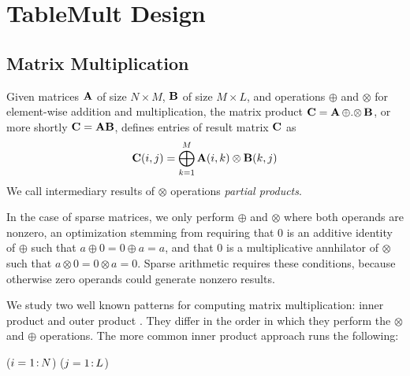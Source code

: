 
\section{TableMult Design}
\label{sDesign}


\subsection{Matrix Multiplication}
\label{sMatMul}
Given matrices $\mathbf{A}$ of size $N \times M$, $\mathbf{B}$ of size $M \times L$,
and operations $\oplus$ and $\otimes$ for element-wise addition and multiplication,
the matrix product $\mathbf{C} = \mathbf{A} \,{\oplus}.{\otimes}\, \mathbf{B} $, or more shortly $\mathbf{C} = \mathbf{A}\mathbf{B}$,
defines entries of result matrix $\mathbf{C}$ as 
\[ \mathbf{C}(i,j) = \bigoplus_{k=1}^M \mathbf{A}(i,k) \otimes \mathbf{B}(k,j) \]
We call intermediary results of $\otimes$ operations \emph{partial products}.

In the case of sparse matrices, we only perform $\oplus$ and $\otimes$ where both operands are nonzero,
an optimization stemming from requiring that 0 is an additive identity of $\oplus$ such that $a \oplus 0 = 0 \oplus a = a$,
and that 0 is a multiplicative annhilator of $\otimes$ such that $a \otimes 0 = 0 \otimes a = 0$.
Sparse arithmetic requires these conditions, because otherwise zero operands could generate nonzero results.



We study two well known patterns for computing matrix multiplication:
inner product and outer product \cite{kruskal1989techniques}. They differ in the order in which they perform
the $\otimes$ and $\oplus$ operations.  The more common inner product approach runs the following: %

\removelatexerror
\begin{algorithm}[H]
\vspace{\algspace}
\fore($i = 1\colon\! N$){
\fore($j = 1\colon\! L$){
}}
\vspace{\algspace}
\end{algorithm}


